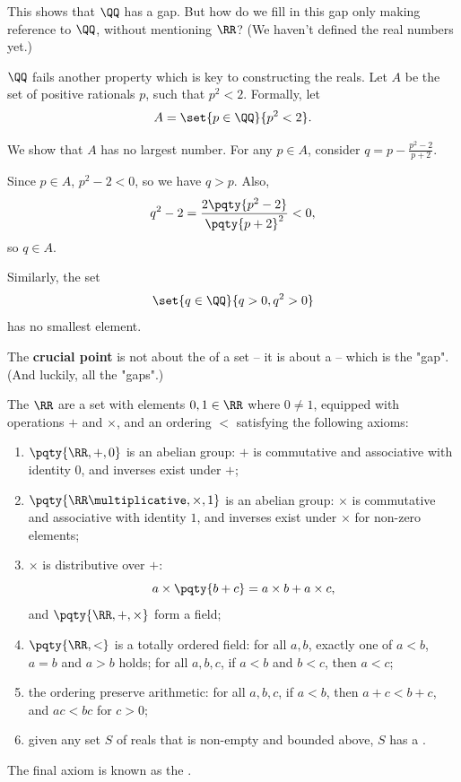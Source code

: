 This shows that \(\QQ\) has a gap. But how do we fill in this gap only making reference to \(\QQ\), without mentioning \(\RR\)? (We haven't defined the real numbers yet.)

\(\QQ\) fails another property which is key to constructing the reals. Let \(A\) be the set of positive rationals \(p\), such that \(p^2 < 2\). Formally, let
\[
    A = \set{p \in \QQ}{p^2 < 2}.
\]

We show that \(A\) has no largest number. For any \(p \in A\), consider \(q = p - \frac{p^2 - 2}{p + 2}\).

Since \(p \in A\), \(p^2 - 2 < 0\), so we have \(q > p\). Also,
\[
    q^2 - 2 = \frac{2 \pqty{p^2 - 2}}{\pqty{p + 2}^2} < 0,
\]
so \(q \in A\).

Similarly, the set
\[
    \set{q \in \QQ}{q > 0, q^2 > 0}
\]
has no smallest element.

The \textbf{crucial point} is not about the  of a set -- it is about a  -- which is the "gap". (And luckily, all the "gaps".)

\begin{definition}[\(\RR\)]
    The  \(\RR\) are a set with elements \(0, 1 \in \RR\) where \(0 \neq 1\), equipped with operations \(+\) and \(\times\), and an ordering \(<\) satisfying the following axioms:
    \begin{enumerate}
        \item \(\pqty{\RR, +, 0}\) is an abelian group: \(+\) is commutative and associative with identity \(0\), and inverses exist under \(+\);
        \item \(\pqty{\RR\multiplicative, \times, 1}\) is an abelian group: \(\times\) is commutative and associative with identity \(1\), and inverses exist under \(\times\) for non-zero elements;
        \item \(\times\) is distributive over \(+\):
        \[
            a \times \pqty{b + c} = a \times b + a \times c,
        \]
        and \(\pqty{\RR, +, \times}\) form a field;
        \item \(\pqty{\RR, <}\) is a totally ordered field: for all \(a, b\), exactly one of \(a < b\), \(a = b\) and \(a > b\) holds; for all \(a, b, c\), if \(a < b\) and \(b < c\), then \(a < c\);
        \item the ordering preserve arithmetic: for all \(a, b, c\), if \(a < b\), then \(a + c < b + c\), and \(ac < bc\) for \(c > 0\);
        \item given any set \(S\) of reals that is non-empty and bounded above, \(S\) has a .
    \end{enumerate}

    The final axiom is known as the .
\end{definition}

